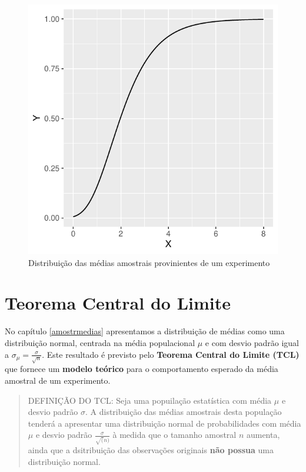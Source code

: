 \documentclass[
]{book}
\begin{document}
\begin{figure}

{\centering \includegraphics[width=20.83in]{probest-cambientais_files/figure-latex/unnamed-chunk-225-1} 

}

\caption{Distribuição das médias amostrais provinientes de um experimento}\label{fig:unnamed-chunk-225}
\end{figure}

\hypertarget{teorema-central-do-limite}{%
\section{Teorema Central do Limite}\label{teorema-central-do-limite}}

No capítulo \ref{amostrmedias} apresentamos a distribuição de médias como uma distribuição normal, centrada na média populacional \(\mu\) e com desvio padrão igual a \(\sigma_{\mu} = \frac{\sigma}{\sqrt{n}}\). Este resultado é previsto pelo \textbf{Teorema Central do Limite (TCL)} que fornece um \textbf{modelo teórico} para o comportamento esperado da média amostral de um experimento.

\begin{quote}
DEFINIÇÃO DO TCL: Seja uma popuilação estatística com média \(\mu\) e desvio padrão \(\sigma\). A distribuição das médias amostrais desta população tenderá a apresentar uma distribuição normal de probabilidades com média \(\mu\) e desvio padrão \(\frac{\sigma}{\sqrt(n)}\) à medida que o tamanho amostral \(n\) aumenta, ainda que a dsitribuição das observações originais \textbf{não possua} uma distribuição normal.
\end{quote}
\end{document}
